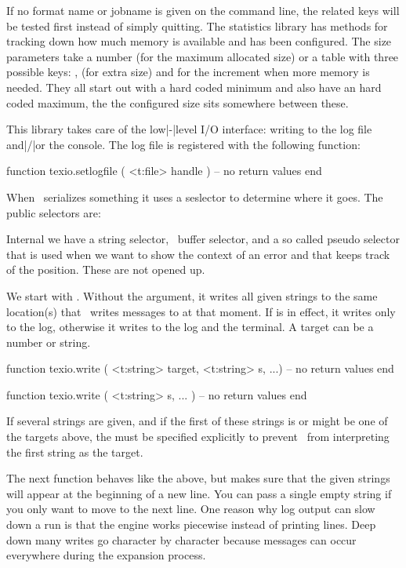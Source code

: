If no format name or jobname is given on the command line, the related keys will
be tested first instead of simply quitting. The statistics library has methods
for tracking down how much memory is available and has been configured. The size
parameters take a number (for the maximum allocated size) or a table with three
possible keys: ,  (for extra size) and  for
the increment when more memory is needed. They all start out with a hard coded
minimum and also have an hard coded maximum, the the configured size sits
somewhere between these.

\stopsection

\startsection[title={Input and output}]

This library takes care of the low|-|level I/O interface: writing to the log file
and|/|or the console. The log file is registered with the following function:

\starttyping[option=LUA]
function texio.setlogfile ( <t:file> handle )
    -- no return values
end
\stoptyping

When \TEX\ serializes something it uses a seslector to determine where it goes.
The public selectors are:


Internal we have a string selector, \LUA\ buffer selector, and a so called pseudo
selector that is used when we want to show the context of an error and that keeps
track of the position. These are not opened up.

We start with . Without the  argument, it writes
all given strings to the same location(s) that \TEX\ writes messages to at that
moment. If \type {\batchmode} is in effect, it writes only to the log, otherwise
it writes to the log and the terminal. A target can be a number or string.

\starttyping[option=LUA]
function texio.write ( <t:string> target, <t:string> s, ...)
    -- no return values
end

function texio.write ( <t:string> s, ... )
    -- no return values
end
\stoptyping

If several strings are given, and if the first of these strings is or might be
one of the targets above, the  must be specified explicitly to
prevent \LUA\ from interpreting the first string as the target.

The next function behaves like the above, but makes sure that the given strings
will appear at the beginning of a new line. You can pass a single empty string if
you only want to move to the next line. One reason why log output can slow down a
run is that the engine works piecewise instead of printing lines. Deep down many
writes go character by character because messages can occur everywhere during the
expansion process.

